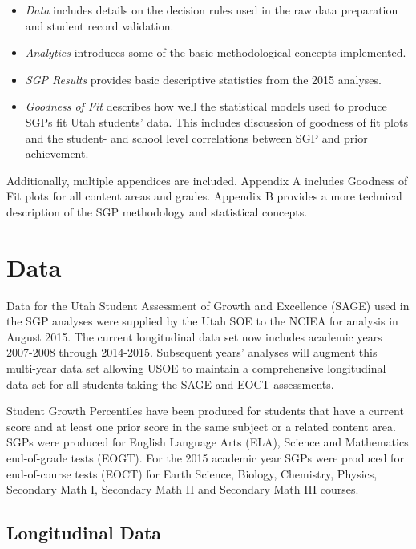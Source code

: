 \documentclass[12pt]{article}
\begin{document}
\begin{itemize}
\itemsep1pt\parskip0pt
\item
  \emph{Data} includes details on the decision rules used in the raw
  data preparation and student record validation.
\item
  \emph{Analytics} introduces some of the basic methodological concepts
  implemented.
\item
  \emph{SGP Results} provides basic descriptive statistics from the 2015
  analyses.
\item
  \emph{Goodness of Fit} describes how well the statistical models used
  to produce SGPs fit Utah students' data. This includes discussion of
  goodness of fit plots and the student- and school level correlations
  between SGP and prior achievement.
\end{itemize}

Additionally, multiple appendices are included. Appendix A includes
Goodness of Fit plots for all content areas and grades. Appendix B
provides a more technical description of the SGP methodology and
statistical concepts.

\pagebreak

\section{Data}\label{data}

Data for the Utah Student Assessment of Growth and Excellence (SAGE)
used in the SGP analyses were supplied by the Utah SOE to the NCIEA for
analysis in August 2015. The current longitudinal data set now includes
academic years 2007-2008 through 2014-2015. Subsequent years' analyses
will augment this multi-year data set allowing USOE to maintain a
comprehensive longitudinal data set for all students taking the SAGE and
EOCT assessments.

Student Growth Percentiles have been produced for students that have a
current score and at least one prior score in the same subject or a
related content area. SGPs were produced for English Language Arts
(ELA), Science and Mathematics end-of-grade tests (EOGT). For the 2015
academic year SGPs were produced for end-of-course tests (EOCT) for
Earth Science, Biology, Chemistry, Physics, Secondary Math I, Secondary
Math II and Secondary Math III courses.

\subsection{Longitudinal Data}\label{longitudinal-data}
\end{document}
